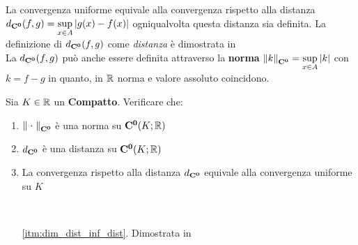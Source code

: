 \begin{observation}
	\label{obs:dist_conv_unif}
	La convergenza uniforme equivale alla convergenza rispetto alla distanza $d_{\mathbf{C^{0}}}(f,g)=\sup\limits_{x\in A}\left|g(x)-f(x)\right|$ ogniqualvolta questa distanza sia definita. La definizione di $d_{\mathbf{C^{0}}}(f,g)$ come \textit{distanza} è dimostrata in \hyperref[ex:dim_dist_conv_unif]{}\\
	La $d_{\mathbf{C^{0}}}(f,g)$ può anche essere definita attraverso la \textbf{norma} $\left\|k\right\|_{\mathbf{C^{0}}}=\sup\limits_{x\in A}\left|k\right|$ con $k = f-g$ in quanto, in $\mathbb{R}$ norma e valore assoluto coincidono.
\end{observation}
\begin{exercise}
	\label{ex:dim_dist_inf}
	Sia $K \in \mathbb{R}$ un \textbf{Compatto}. Verificare che:
	\begin{enumerate}
		\item $\left\|\;\cdot\;\right\|_{\mathbf{C^{0}}}$ è una norma su $\mathbf{C^{0}}(K; \mathbb{R})$
		\item \label{itm:dim_dist_inf_dist} $d_{\mathbf{C^{0}}}$ è una distanza su $\mathbf{C^{0}}(K; \mathbb{R})$
		\item La convergenza rispetto alla distanza $d_{\mathbf{C^{0}}}$ equivale alla convergenza uniforme su $K$
	\end{enumerate}
	\begin{solution}~
		\begin{enumerate}
			\item[\ref{itm:dim_dist_inf_dist}.] Dimostrata in \hyperref[ex:dim_dist_conv_unif]{}
		\end{enumerate}
	\end{solution}
\end{exercise}
